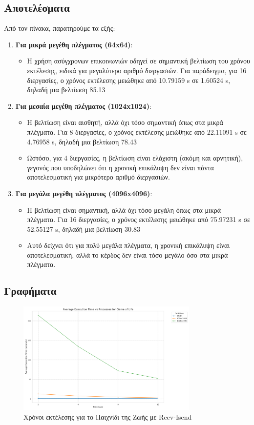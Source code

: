 \documentclass{article}
\begin{document}
\subsection*{Αποτελέσματα}
Από τον πίνακα, παρατηρούμε τα εξής:
\begin{enumerate}
    \item \textbf{Για μικρά μεγέθη πλέγματος (64x64)}:
    \begin{itemize}
        \item Η χρήση ασύγχρονων επικοινωνιών οδηγεί σε σημαντική βελτίωση του χρόνου εκτέλεσης, ειδικά για μεγαλύτερο αριθμό διεργασιών. Για παράδειγμα, για 16 διεργασίες, ο χρόνος εκτέλεσης μειώθηκε από 10.79159 s σε 1.60524 s, δηλαδή μια βελτίωση 85.13%
    \end{itemize}
    \item \textbf{Για μεσαία μεγέθη πλέγματος (1024x1024)}:
    \begin{itemize}
        \item Η βελτίωση είναι αισθητή, αλλά όχι τόσο σημαντική όπως στα μικρά πλέγματα. Για 8 διεργασίες, ο χρόνος εκτέλεσης μειώθηκε από 22.11091 s σε 4.76958 s, δηλαδή μια βελτίωση 78.43%
        \item Ωστόσο, για 4 διεργασίες, η βελτίωση είναι ελάχιστη (ακόμη και αρνητική), γεγονός που υποδηλώνει ότι η χρονική επικάλυψη δεν είναι πάντα αποτελεσματική για μικρότερο αριθμό διεργασιών.
    \end{itemize}
    \item \textbf{Για μεγάλα μεγέθη πλέγματος (4096x4096)}:
    \begin{itemize}
        \item Η βελτίωση είναι σημαντική, αλλά όχι τόσο μεγάλη όπως στα μικρά πλέγματα. Για 16 διεργασίες, ο χρόνος εκτέλεσης μειώθηκε από 75.97231 s σε 52.55127 s, δηλαδή μια βελτίωση 30.83%
        \item Αυτό δείχνει ότι για πολύ μεγάλα πλέγματα, η χρονική επικάλυψη είναι αποτελεσματική, αλλά το κέρδος δεν είναι τόσο μεγάλο όσο στα μικρά πλέγματα.
    \end{itemize}
\end{enumerate}
\subsection*{Γραφήματα}
\newpage
\begin{figure}[h]
    \centering
    \includegraphics[width=0.8\textwidth]{game_of_life_recv_results.png}
    \caption{Χρόνοι εκτέλεσης για το Παιχνίδι της Ζωής με Recv-Isend}
\end{figure}
\end{document}
